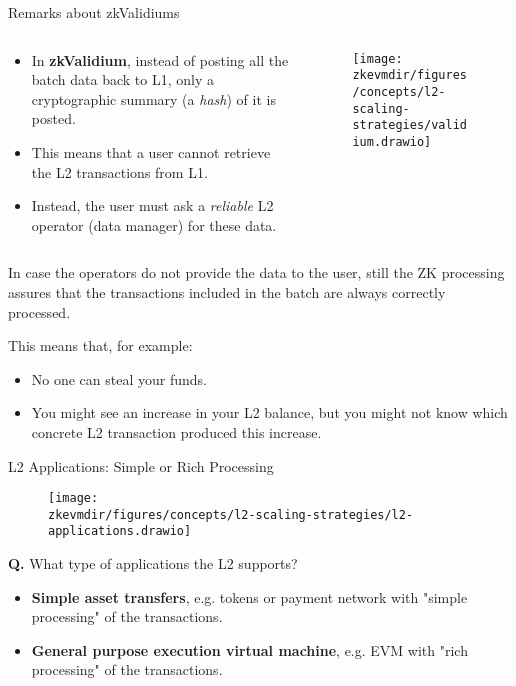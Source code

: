 \begin{frame}[allowframebreaks]{Remarks about zkValidiums}
\begin{columns}
\begin{column}{0.35 \textwidth}
\begin{itemize}
\small
\item In \textbf{zkValidium}, instead of posting all the batch data back to L1, only a cryptographic summary (a \textit{hash}) of it is posted.
\item This means that a user cannot retrieve the L2 transactions from L1. 
\item Instead, the user must ask a \textit{reliable} L2 operator (data manager) for these data.
\end{itemize}
\end{column}
\begin{column}{0.65 \textwidth}
\begin{figure}
\centering
\texttt{[image: \\zkevmdir/figures/concepts/l2-scaling-strategies/validium.drawio]}
\end{figure}
\end{column}
\end{columns}

\framebreak
In case the operators do not provide the data to the user, still the ZK processing assures that the transactions included in the batch
are always correctly processed.

\vspace{0.2cm}
This means that, for example: 

\vspace{0.1cm}
  \begin{itemize}
  \item No one can steal your funds. 
  \item You might see an increase in your L2 balance, but you might not know which concrete L2 transaction produced this increase.
  \end{itemize}
\end{frame}






\begin{frame}{L2 Applications: Simple or Rich Processing}
\begin{figure}
\texttt{[image: \\zkevmdir/figures/concepts/l2-scaling-strategies/l2-applications.drawio]}
\end{figure}

\textbf{Q.} What type of applications the L2 supports?
\begin{itemize}
\item \textbf{Simple asset transfers}, e.g. tokens or payment network with "simple processing" of the transactions.
\item \textbf{General purpose execution virtual machine}, e.g. EVM with "rich processing" of the transactions.
\end{itemize}
\end{frame}





